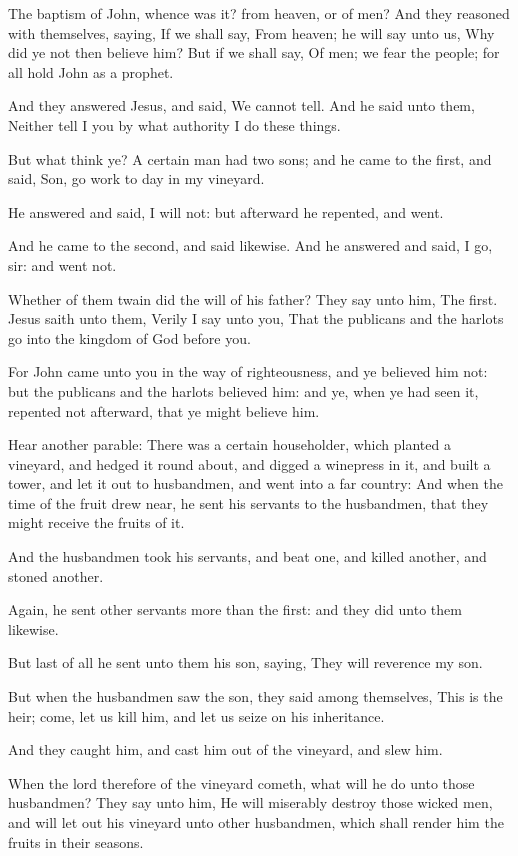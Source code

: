 \verse The baptism of John, whence was it? from heaven, or of men? And they reasoned with themselves, saying, If we shall say, From heaven; he will say unto us, Why did ye not then believe him?  \verse But if we shall say, Of men; we fear the people; for all hold John as a prophet.

\verse And they answered Jesus, and said, We cannot tell. And he said unto them, Neither tell I you by what authority I do these things.

\verse But what think ye? A certain man had two sons; and he came to the first, and said, Son, go work to day in my vineyard.

\verse He answered and said, I will not: but afterward he repented, and went.

\verse And he came to the second, and said likewise. And he answered and said, I go, sir: and went not.

\verse Whether of them twain did the will of his father? They say unto him, The first. Jesus saith unto them, Verily I say unto you, That the publicans and the harlots go into the kingdom of God before you.

\verse For John came unto you in the way of righteousness, and ye believed him not: but the publicans and the harlots believed him: and ye, when ye had seen it, repented not afterward, that ye might believe him.

\verse Hear another parable: There was a certain householder, which planted a vineyard, and hedged it round about, and digged a winepress in it, and built a tower, and let it out to husbandmen, and went into a far country: \verse And when the time of the fruit drew near, he sent his servants to the husbandmen, that they might receive the fruits of it.

\verse And the husbandmen took his servants, and beat one, and killed another, and stoned another.

\verse Again, he sent other servants more than the first: and they did unto them likewise.

\verse But last of all he sent unto them his son, saying, They will reverence my son.

\verse But when the husbandmen saw the son, they said among themselves, This is the heir; come, let us kill him, and let us seize on his inheritance.

\verse And they caught him, and cast him out of the vineyard, and slew him.

\verse When the lord therefore of the vineyard cometh, what will he do unto those husbandmen?  \verse They say unto him, He will miserably destroy those wicked men, and will let out his vineyard unto other husbandmen, which shall render him the fruits in their seasons.

